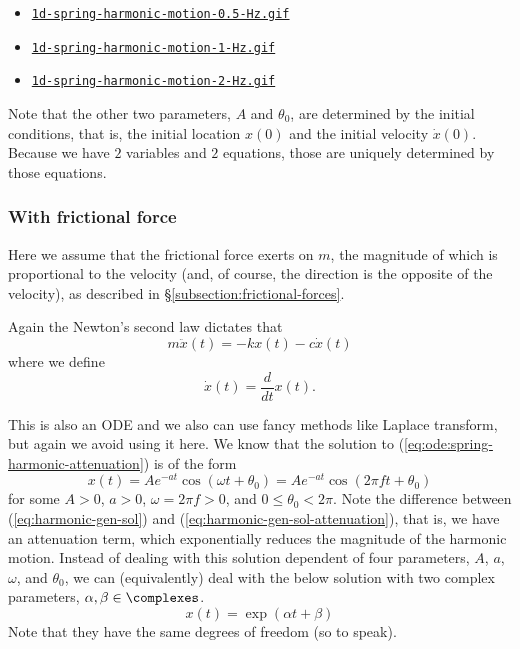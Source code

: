 \documentclass{article}
\begin{document}
\begin{itemize}
\item
{\tt \href{https://github.com/sungheeyun/science/blob/main/animations/1d-spring-harmonic-motion-0.5-Hz.gif}{1d-spring-harmonic-motion-0.5-Hz.gif}}
\item
{\tt \href{https://github.com/sungheeyun/science/blob/main/animations/1d-spring-harmonic-motion-1-Hz.gif}{1d-spring-harmonic-motion-1-Hz.gif}}
\item
{\tt \href{https://github.com/sungheeyun/science/blob/main/animations/1d-spring-harmonic-motion-2-Hz.gif}{1d-spring-harmonic-motion-2-Hz.gif}}
\end{itemize}

Note that the other two parameters, $A$ and $\theta_0$, are determined by the initial conditions,
that is, the initial location $x(0)$ and the initial velocity $\dot{x}(0)$.
Because we have $2$ variables and $2$ equations,
those are uniquely determined by those equations.


\subsubsection{With frictional force}
\label{subsubsection:spring-with-frictional-force}

Here we assume that the frictional force exerts on $m$,
the magnitude of which is proportional to the velocity
(and, of course, the direction is the opposite of the velocity),
as described in \S\ref{subsection:frictional-forces}.

Again the Newton's second law dictates that
\begin{equation}
\label{eq:ode:spring-harmonic-attenuation}
	m \ddot{x}(t)
	=
	-kx(t) - c \dot{x}(t)
\end{equation}
where we define
\[
	\dot{x}(t) = \frac{d}{dt} x(t).
\]

This is also an ODE and we also can use fancy methods like Laplace transform, but again we avoid using it here.
We know that the solution to (\ref{eq:ode:spring-harmonic-attenuation})
is of the form
\begin{equation}
\label{eq:harmonic-gen-sol-attenuation}
	x(t) = A e^{-at} \cos(\omega t + \theta_0)
	= A e^{-at}\cos(2\pi f t + \theta_0)
\end{equation}
for some $A>0$, $a>0$, $\omega=2\pi f >0$, and $0\leq \theta_0 <2\pi$.
Note the difference between (\ref{eq:harmonic-gen-sol}) and (\ref{eq:harmonic-gen-sol-attenuation}),
that is,
we have an attenuation term,
which exponentially reduces the magnitude of the harmonic motion.
Instead of dealing with this solution dependent of four parameters, $A$, $a$, $\omega$, and $\theta_0$,
we can (equivalently) deal with the below solution with two complex parameters, $\alpha,\beta\in\complexes$.
\begin{equation}
\label{eq:harmonic-gen-sol-complex}
x(t) = \exp(\alpha t + \beta)
\end{equation}
Note that they have the same degrees of freedom (so to speak).
\end{document}
